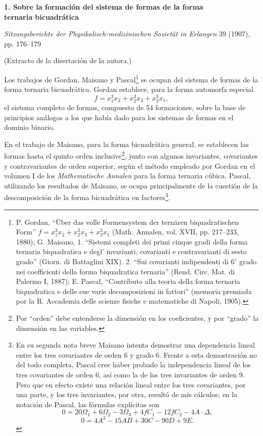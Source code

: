 \documentclass[11pt]{article}
\begin{document}
\begin{center}
{\Large\bfseries 1. Sobre la formación del sistema de formas de la forma\\ ternaria bicuadrática}\par
\vspace{1.5em}
\emph{Sitzungsberichte der Physikalisch-medizinischen Sozietät in Erlangen} 39 (1907), pp. 176--179
\end{center}

\vspace{3em}
\begin{center}
(Extracto de la disertación de la autora.)
\end{center}

Los trabajos de Gordan, Maisano y Pascal\footnote{P. Gordan, ``Über das volle Formensystem der ternären biquadratischen Form'' \(f=x_1^3x_2+x_2^3x_3+x_3^3x_1\) (Math. Annalen, vol. XVII, pp. 217--233, 1880); G. Maisano, 1. ``Sistemi completi dei primi cinque gradi della forma ternaria biquadratica e degl' invarianti, covarianti e contravarianti di sesto grado'' (Giorn. di Battaglini XIX). 2. ``Sui covarianti indipendenti di \(6^\circ\) grado nei coefficienti della forma biquadratica ternaria'' (Rend. Circ. Mat. di Palermo I, 1887); E. Pascal, ``Contributo alla teoria della forma ternaria biquadratica e delle sue varie decomposizioni in fattori'' (memoria premiada por la R. Accademia delle scienze fisiche e matematiche di Napoli, 1905).} se ocupan del sistema de formas de la forma ternaria bicuadrática. Gordan establece, para la forma automorfa especial
\[
f=x_1^3x_2+x_2^3x_3+x_3^3x_1,
\]
el sistema completo de formas, compuesto de 54 formaciones, sobre la base de principios análogos a los que había dado para los sistemas de formas en el dominio binario.

En el trabajo de Maisano, para la forma bicuadrática general, se establecen las formas hasta el quinto orden inclusive\footnote{Por ``orden'' debe entenderse la dimensión en los coeficientes, y por ``grado'' la dimensión en las variables.}, junto con algunos invariantes, covariantes y contravariantes de orden superior, según el método empleado por Gordan en el volumen I de los \emph{Mathematische Annalen} para la forma ternaria cúbica. Pascal, utilizando los resultados de Maisano, se ocupa principalmente de la cuestión de la descomposición de la forma bicuadrática en factores\footnote{En su segunda nota breve Maisano intenta demostrar una dependencia lineal entre los tres covariantes de orden 6 y grado 6. Frente a esta demostración no del todo completa, Pascal cree haber probado la independencia lineal de los tres covariantes de orden 6, así como la de los tres invariantes de orden 9. Pero que en efecto existe una relación lineal entre los tres covariantes, por una parte, y los tres invariantes, por otra, resultó de mis cálculos; en la notación de Pascal, las fórmulas explícitas son
\[
0=20\Omega_1+6\Omega_2-3\Omega_3+4fC_1-12fC_2-4A\cdot\Delta,
\]
\[
0=4A^3-15AB+30C-90D+9E.
\]}.
\end{document}
